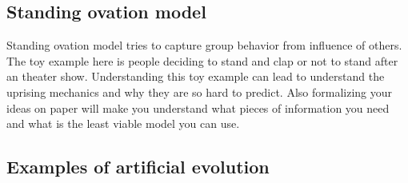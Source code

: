 \documentclass[pdftex, 12pt, a4paper]{report}
\begin{document}
	\subsection{Standing ovation model}
	
	Standing ovation model tries to capture group behavior from influence of others. The toy example here is people deciding to stand and clap or not to stand after an theater show. Understanding this toy example can lead to understand the uprising mechanics and why they are so hard to predict. Also formalizing your ideas on paper will make you understand what pieces of information you need and what is the least viable model you can use.
	 
	\subsection{Examples of artificial evolution }
	
\end{document}

